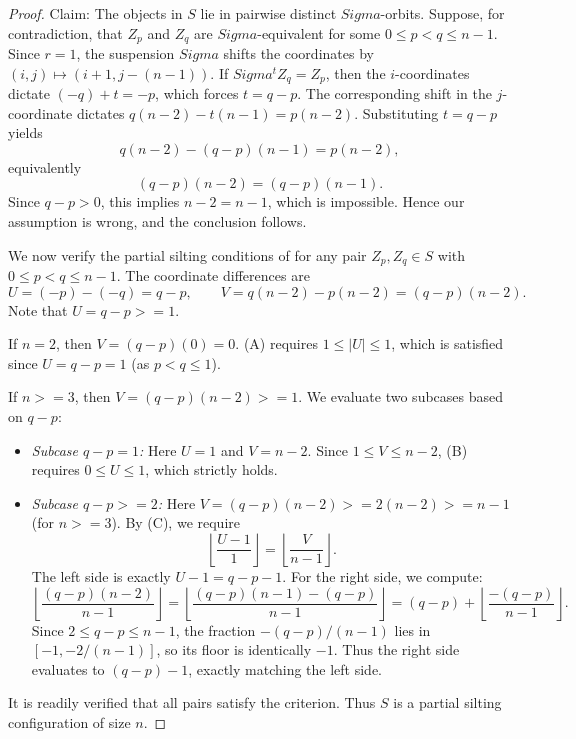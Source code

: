 \documentclass[11pt, a4paper]{article}
\theoremstyle{definition}
\def\Sigma{Sigma}%
\def\ge{>=}%
\begin{document}
\begin{proof}
Claim: The objects in $S$ lie in pairwise distinct $\Sigma$-orbits.
Suppose, for contradiction, that $Z_p$ and $Z_q$ are $\Sigma$-equivalent for some $0 \le p < q \le n-1$. Since $r=1$, the suspension $\Sigma$ shifts the coordinates by $(i,j) \mapsto (i+1, j-(n-1))$. If $\Sigma^t Z_q = Z_p$, then the $i$-coordinates dictate $(-q) + t = -p$, which forces $t = q-p$. The corresponding shift in the $j$-coordinate dictates $q(n-2) - t(n-1) = p(n-2)$. Substituting $t = q-p$ yields
\[
  q(n-2) - (q-p)(n-1) = p(n-2),
\]
equivalently
\[
  (q-p)(n-2) = (q-p)(n-1).
\]
Since $q-p > 0$, this implies $n-2 = n-1$, which is impossible. Hence our assumption is wrong, and the conclusion follows.

We now verify the partial silting conditions of  for any pair $Z_p, Z_q \in S$ with $0 \le p < q \le n-1$. The coordinate differences are
\[
  U = (-p) - (-q) = q - p,
  \qquad
  V = q(n-2) - p(n-2) = (q-p)(n-2).
\]
Note that $U = q-p \ge 1$.

If $n = 2$, then $V = (q-p)(0) = 0$. (A) requires $1 \le |U| \le 1$, which is satisfied since $U = q-p = 1$ (as $p < q \le 1$).

If $n \ge 3$, then $V = (q-p)(n-2) \ge 1$. We evaluate two subcases based on $q-p$:
\begin{itemize}
    \item \emph{Subcase $q-p = 1$:} Here $U = 1$ and $V = n-2$. Since $1 \le V \le n-2$, \textup{(B)} requires $0 \le U \le 1$, which strictly holds.
    \item \emph{Subcase $q-p \ge 2$:} Here $V = (q-p)(n-2) \ge 2(n-2) \ge n-1$ (for $n \ge 3$). By (C), we require
    \[
      \left\lfloor \frac{U-1}{1} \right\rfloor
      =
      \left\lfloor \frac{V}{n-1} \right\rfloor.
    \]
    The left side is exactly $U-1 = q-p-1$. For the right side, we compute:
    \[
      \left\lfloor \frac{(q-p)(n-2)}{n-1} \right\rfloor
      =
      \left\lfloor \frac{(q-p)(n-1) - (q-p)}{n-1} \right\rfloor
      =
      (q-p) + \left\lfloor \frac{-(q-p)}{n-1} \right\rfloor.
    \]
    Since $2 \le q-p \le n-1$, the fraction $-(q-p)/(n-1)$ lies in $[-1, -2/(n-1)]$, so its floor is identically $-1$. Thus the right side evaluates to $(q-p) - 1$, exactly matching the left side.
\end{itemize}
It is readily verified that all pairs satisfy the criterion. Thus $S$ is a partial silting configuration of size $n$.
\end{proof}
\end{document}
